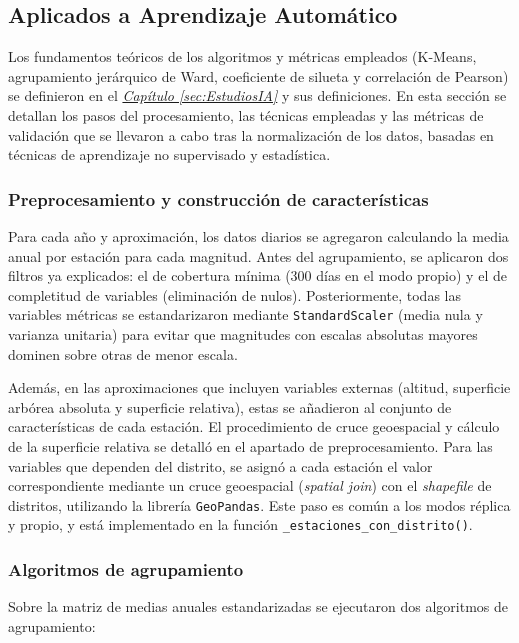 \subsection{Aplicados a Aprendizaje Automático} \label{sec:Metodos_ML}

Los fundamentos teóricos de los algoritmos y métricas empleados (K-Means, agrupamiento jerárquico de Ward, coeficiente de silueta y correlación de Pearson) se definieron en el \hyperref[sec:EstudiosIA]{\textit{Capítulo \ref*{sec:EstudiosIA}}} y sus definiciones. En esta sección se detallan los pasos del procesamiento, las técnicas empleadas y las métricas de validación que se llevaron a cabo tras la normalización de los datos, basadas en técnicas de aprendizaje no supervisado y estadística.

\subsubsection{Preprocesamiento y construcción de características}

Para cada año y aproximación, los datos diarios se agregaron calculando la media anual por estación para cada magnitud. Antes del agrupamiento, se aplicaron dos filtros ya explicados: el de cobertura mínima (300 días en el modo propio) y el de completitud de variables (eliminación de nulos). Posteriormente, todas las variables métricas se estandarizaron mediante \texttt{StandardScaler} (media nula y varianza unitaria) para evitar que magnitudes con escalas absolutas mayores dominen sobre otras de menor escala.

Además, en las aproximaciones que incluyen variables externas (altitud, superficie arbórea absoluta y superficie relativa), estas se añadieron al conjunto de características de cada estación. El procedimiento de cruce geoespacial y cálculo de la superficie relativa se detalló en el apartado de preprocesamiento. Para las variables que dependen del distrito, se asignó a cada estación el valor correspondiente mediante un cruce geoespacial (\textit{spatial join}) con el \textit{shapefile} de distritos, utilizando la librería \texttt{GeoPandas}. Este paso es común a los modos réplica y propio, y está implementado en la función \texttt{\_estaciones\_con\_distrito()}.

\subsubsection{Algoritmos de agrupamiento}

Sobre la matriz de medias anuales estandarizadas se ejecutaron dos algoritmos de agrupamiento:

